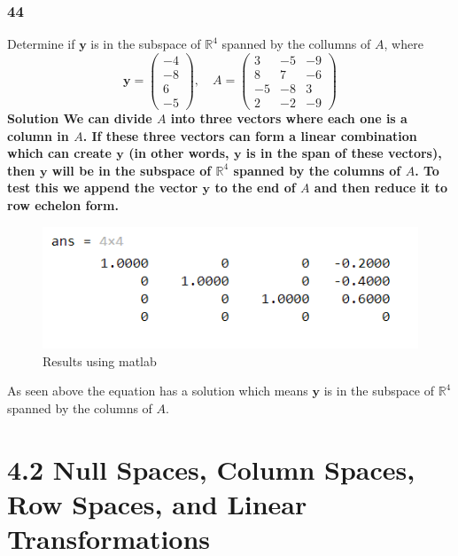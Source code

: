     \subsubsection*{44}
    Determine if $ \mathbf y $ is in the subspace of $ \mathbb R^{4} $ spanned by the collumns of $ A $, where
    \[
    \mathbf y = 
    \begin{pmatrix}
       -4  \\ 
       -8  \\ 
       6  \\
       -5  
    \end{pmatrix}, \quad
    A = \begin{pmatrix}
      3 & -5 & -9 \\ 
      8 & 7 & -6 \\ 
      -5 & -8 & 3 \\ 
      2 & -2 & -9
    \end{pmatrix}
    \]
    \newline \newline 
    \bf{Solution} \newline \newline 
    We can divide $ A $ into three vectors where each one is a column in $ A $. If these three vectors can form a linear combination which can create $ \mathbf y $ (in other words, $ \mathbf y $ is in the span of these vectors), then $ \mathbf y $ will be in the subspace of $ \mathbb R^{4}$ spanned by the columns of $ A $. To test this we append the vector $ \mathbf y $ to the end of $ A $ and then reduce it to row echelon form. 
    \begin{figure}[h!]
      \centering
      \includegraphics[scale = .7]{Bilder/Exercise_44_matlab.png}
      \caption{Results using matlab}
      \label{fig:figure1}
    \end{figure}
    As seen above the equation has a solution which means $ \mathbf  y $ is in the subspace of $ \mathbb R^{4}$ spanned by the columns of $ A $.

\section*{4.2 Null Spaces, Column Spaces, Row Spaces, and Linear Transformations}
